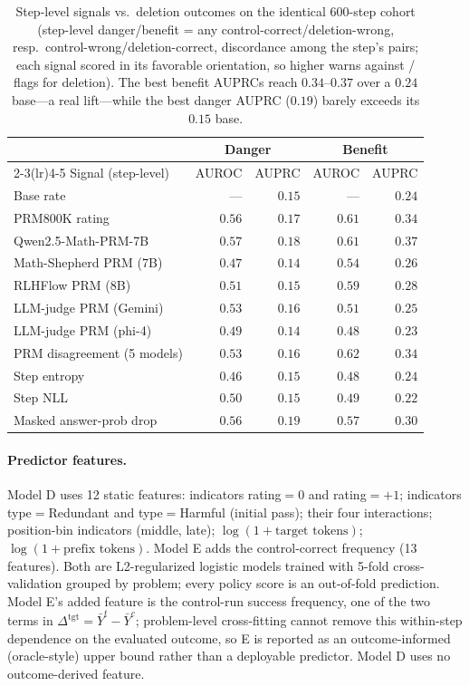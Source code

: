 \documentclass[11pt]{article}
\begin{document}
\begin{table}[h]
\centering
\scriptsize
\setlength{\tabcolsep}{3pt}
\begin{tabular}{@{}lrrrr@{}}
\toprule
 & \multicolumn{2}{c}{Danger} & \multicolumn{2}{c}{Benefit} \\
\cmidrule(lr){2-3}\cmidrule(lr){4-5}
Signal (step-level) & AUROC & AUPRC & AUROC & AUPRC \\
\midrule
Base rate & --- & $0.15$ & --- & $0.24$ \\
PRM800K rating & $0.56$ & $0.17$ & $0.61$ & $0.34$ \\
Qwen2.5-Math-PRM-7B & $0.57$ & $0.18$ & $0.61$ & $\mathbf{0.37}$ \\
Math-Shepherd PRM (7B) & $0.47$ & $0.14$ & $0.54$ & $0.26$ \\
RLHFlow PRM (8B) & $0.51$ & $0.15$ & $0.59$ & $0.28$ \\
LLM-judge PRM (Gemini) & $0.53$ & $0.16$ & $0.51$ & $0.25$ \\
LLM-judge PRM (phi-4) & $0.49$ & $0.14$ & $0.48$ & $0.23$ \\
PRM disagreement (5 models) & $0.53$ & $0.16$ & $\mathbf{0.62}$ & $0.34$ \\
Step entropy & $0.46$ & $0.15$ & $0.48$ & $0.24$ \\
Step NLL & $0.50$ & $0.15$ & $0.49$ & $0.22$ \\
Masked answer-prob drop & $0.56$ & $0.19$ & $0.57$ & $0.30$ \\
\bottomrule
\end{tabular}
\caption{Step-level signals vs.\ deletion outcomes on the identical 600-step cohort (step-level danger/benefit = any control-correct/deletion-wrong, resp.\ control-wrong/deletion-correct, discordance among the step's pairs; each signal scored in its favorable orientation, so higher warns against / flags for deletion). The best benefit AUPRCs reach $0.34$--$0.37$ over a $0.24$ base---a real lift---while the best danger AUPRC ($0.19$) barely exceeds its $0.15$ base.}
\label{tab:signals}
\end{table}

\paragraph{Predictor features.} Model D uses 12 static features: indicators rating$=0$ and rating$={+}1$; indicators type$=$Redundant and type$=$Harmful (initial pass); their four interactions; position-bin indicators (middle, late); $\log(1+\text{target tokens})$; $\log(1+\text{prefix tokens})$. Model E adds the control-correct frequency (13 features). Both are L2-regularized logistic models trained with 5-fold cross-validation grouped by problem; every policy score is an out-of-fold prediction. Model E's added feature is the control-run success frequency, one of the two terms in $\Delta^{\mathrm{tgt}}=\bar Y^{t}-\bar Y^{c}$; problem-level cross-fitting cannot remove this within-step dependence on the evaluated outcome, so E is reported as an outcome-informed (oracle-style) upper bound rather than a deployable predictor. Model D uses no outcome-derived feature.
\end{document}
